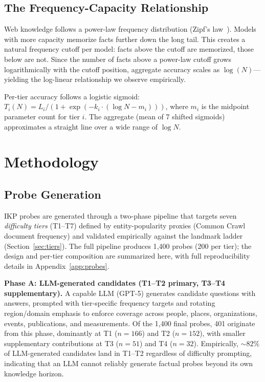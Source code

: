 \documentclass[11pt]{article}
\begin{document}
\subsection{The Frequency-Capacity Relationship}

Web knowledge follows a power-law frequency distribution (Zipf's law~\citep{zipf1949human}). Models with more capacity memorize facts further down the long tail. This creates a natural frequency cutoff per model: facts above the cutoff are memorized, those below are not. Since the number of facts above a power-law cutoff grows logarithmically with the cutoff position, aggregate accuracy scales as $\log(N)$---yielding the log-linear relationship we observe empirically.

Per-tier accuracy follows a logistic sigmoid: $T_i(N) = L_i / (1 + \exp(-k_i \cdot (\log N - m_i)))$, where $m_i$ is the midpoint parameter count for tier $i$. The aggregate (mean of 7 shifted sigmoids) approximates a straight line over a wide range of $\log N$.

\section{Methodology}
\label{sec:method}

\subsection{Probe Generation}
\label{sec:probe-generation}

IKP probes are generated through a two-phase pipeline that targets seven \emph{difficulty tiers} (T1--T7) defined by entity-popularity proxies (Common Crawl document frequency) and validated empirically against the landmark ladder (Section~\ref{sec:tiers}). The full pipeline produces 1{,}400 probes (200 per tier); the design and per-tier composition are summarized here, with full reproducibility details in Appendix~\ref{app:probes}.

\textbf{Phase A: LLM-generated candidates (T1--T2 primary, T3--T4 supplementary).} A capable LLM (GPT-5) generates candidate questions with answers, prompted with tier-specific frequency targets and rotating region/domain emphasis to enforce coverage across people, places, organizations, events, publications, and measurements. Of the 1{,}400 final probes, 401 originate from this phase, dominantly at T1 ($n=166$) and T2 ($n=152$), with smaller supplementary contributions at T3 ($n=51$) and T4 ($n=32$). Empirically, ${\sim}82\%$ of LLM-generated candidates land in T1--T2 regardless of difficulty prompting, indicating that an LLM cannot reliably generate factual probes beyond its own knowledge horizon.
\end{document}
